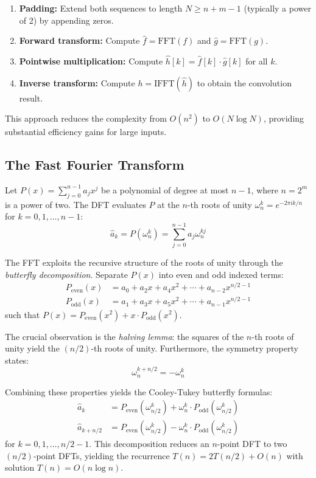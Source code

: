 \documentclass[a4paper]{article}
\theoremstyle{definition}
\begin{document}
\begin{enumerate}
    \item \textbf{Padding:} Extend both sequences to length \( N \geq n+m-1 \) (typically a power of 2) by appending zeros.
    \item \textbf{Forward transform:} Compute \( \hat{f} = \text{FFT}(f) \) and \( \hat{g} = \text{FFT}(g) \).
    \item \textbf{Pointwise multiplication:} Compute \( \hat{h}[k] = \hat{f}[k] \cdot \hat{g}[k] \) for all \( k \).
    \item \textbf{Inverse transform:} Compute \( h = \text{IFFT}(\hat{h}) \) to obtain the convolution result.
\end{enumerate}

This approach reduces the complexity from \( O(n^2) \) to \( O(N \log N) \), providing substantial efficiency gains for large inputs.

\subsection{The Fast Fourier Transform}

Let \( P(x) = \sum_{j=0}^{n-1} a_j x^j \) be a polynomial of degree at most \( n-1 \), where \( n = 2^m \) is a power of two. The DFT evaluates \( P \) at the \( n \)-th roots of unity \( \omega_n^k = e^{-2\pi i k / n} \) for \( k = 0, 1, \ldots, n-1 \):
\[
\hat{a}_k = P(\omega_n^k) = \sum_{j=0}^{n-1} a_j \omega_n^{kj}
\]

The FFT exploits the recursive structure of the roots of unity through the \textit{butterfly decomposition}. Separate \( P(x) \) into even and odd indexed terms:
\begin{align*}
P_{\text{even}}(x) &= a_0 + a_2 x + a_4 x^2 + \cdots + a_{n-2} x^{n/2-1} \\
P_{\text{odd}}(x) &= a_1 + a_3 x + a_5 x^2 + \cdots + a_{n-1} x^{n/2-1}
\end{align*}
such that \( P(x) = P_{\text{even}}(x^2) + x \cdot P_{\text{odd}}(x^2) \).

The crucial observation is the \textit{halving lemma}: the squares of the \( n \)-th roots of unity yield the \( (n/2) \)-th roots of unity. Furthermore, the symmetry property states:
\[
\omega_n^{k + n/2} = -\omega_n^k
\]

Combining these properties yields the Cooley-Tukey butterfly formulas:
\begin{align}
\hat{a}_k &= P_{\text{even}}(\omega_{n/2}^k) + \omega_n^k \cdot P_{\text{odd}}(\omega_{n/2}^k) \\
\hat{a}_{k+n/2} &= P_{\text{even}}(\omega_{n/2}^k) - \omega_n^k \cdot P_{\text{odd}}(\omega_{n/2}^k)
\end{align}
for \( k = 0, 1, \ldots, n/2-1 \). This decomposition reduces an \( n \)-point DFT to two \( (n/2) \)-point DFTs, yielding the recurrence \( T(n) = 2T(n/2) + O(n) \) with solution \( T(n) = O(n \log n) \).
\end{document}
